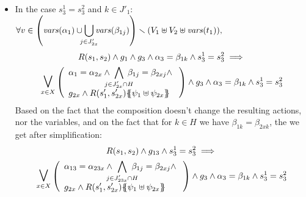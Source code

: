 \documentclass[runningheads]{llncs}
\begin{document}
\begin{enumerate}
\begin{itemize}
\item In the case $ s^1_3=s^2_3$ and $k \in J'_1$:\\
$\displaystyle {\forall v \in {\left(\mathit{vars}{\left(\alpha_{1}\right)}  \cup\!\!\! \bigcup_{j \in J'_{2x}} \!\!\!\mathit{vars}{\left(\beta_{1j} \right)} \right)} \smallsetminus{\left(V_1 \uplus  V_2 \uplus \mathit{vars}{\left(t_1\right)}\right)}},$
\begin{multline*}
R\mpar{s_1, s_{2}} \wedge g_1 \wedge g_3 \wedge \alpha_3=\beta_{1k} \wedge s^1_3=s^2_3\implies\\ \operatorname*{\bigsymb{\bigvee}}_{x \in X} \mpar{\everymath{\displaystyle}
\begin{array}{l}
			\alpha_1 = \alpha_{2x} \wedge \bigwedge_\subbox{j \in J'_{2x} \cap H} \beta_{1j} = \beta_{2xj} \nwedge\\
			 g_{2x} \wedge R\mpar{s'_1, s'_{2x}}\psubst{\psi_1 \uplus \psi_{2x}}
		\end{array}}  \wedge g_3 \wedge \alpha_3=\beta_{1k} \wedge s^1_3=s^2_3
\end{multline*}	
Based on the fact that the composition doesn't change the resulting actions, nor the variables, and on the fact that for $k \in H$ we have $\beta_{1k}=\beta_{2xk}$, the we get after simplification:
\begin{multline*}
R\mpar{s_1, s_{2}} \wedge g_{13} \wedge s^1_3=s^2_3\implies\\ \operatorname*{\bigsymb{\bigvee}}_{x \in X} \mpar{\everymath{\displaystyle}
\begin{array}{l}
			\alpha_{13} = \alpha_{23x} \wedge \bigwedge_\subbox{j \in J'_{23x} \cap H} \beta_{1j} = \beta_{2xj} \nwedge\\
			 g_{2x} \wedge R\mpar{s'_1, s'_{2x}}\psubst{\psi_1 \uplus \psi_{2x}}
		\end{array}}  \wedge g_3 \wedge \alpha_3=\beta_{1k} \wedge s^1_3=s^2_3
\end{multline*}	



\end{itemize}
\end{enumerate}
\end{document}
